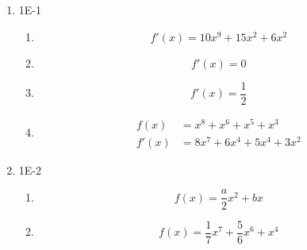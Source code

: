 \documentclass{article}
\begin{document}
\begin{enumerate}
\item 1E-1
    \begin{enumerate}
        \item 
        \begin{equation*}
            f'(x) = 10x^9 + 15x^2 + 6x^2
         \end{equation*}

        \item 
        \begin{equation*}
        f'(x) = 0
        \end{equation*}

        \item 
        \begin{equation*}
        f'(x) = \frac{1}{2}
        \end{equation*}

        \item 
        \begin{align*}
        f(x) &= x^8 + x^6 + x^5 + x^3 \\
        f'(x) &= 8x^7 + 6x^4 + 5x^4 + 3x^2
        \end{align*}
    \end{enumerate}    
\item 1E-2
    \begin{enumerate}

    \item 
    \begin{equation*}
        f(x) = \frac{a}{2}x^2 + bx
    \end{equation*}

    \item 
    \begin{equation*}
        f(x) = \frac{1}{7}x^7 + \frac{5}{6}x^6 + x^4
    \end{equation*}


\end{enumerate}
\end{enumerate}
\end{document}
